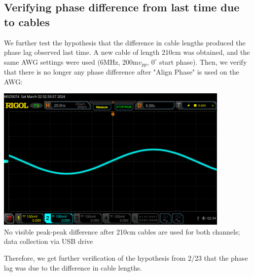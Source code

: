 \documentclass{article}
\begin{document}
    \subsection*{Verifying phase difference from last time due to cables}
    We further test the hypothesis that the difference in cable lengths produced the phase lag observed last time. A new cable of length 210cm was obtained, and the same AWG settings were used (6MHz, 200m$v_{pp}$, $0^\circ$ start phase). Then, we verify that there is no longer any phase difference after "Align Phase" is used on the AWG:
    \begin{mdframed}[backgroundcolor=gray!20, align = center, userdefinedwidth = 4.8in]
    \includegraphics[width = 4.5in]{img/CableLagFixed.png}
    \\No visible peak-peak difference after 210cm cables are used for both channels; data collection via USB drive
    \end{mdframed}
    Therefore, we get further verification of the hypothesis from 2/23 that the phase lag was due to the difference in cable lengths.
\end{document}
